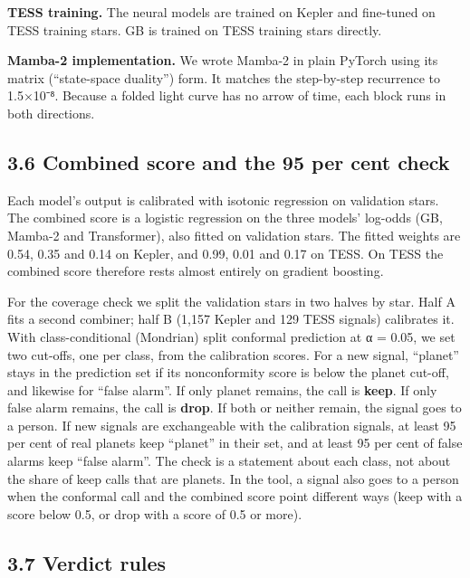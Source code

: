 \documentclass[
]{article}
\begin{document}
\textbf{TESS training.} The neural models are trained on Kepler and
fine-tuned on TESS training stars. GB is trained on TESS training stars
directly.

\textbf{Mamba-2 implementation.} We wrote Mamba-2 in plain PyTorch using
its matrix (``state-space duality'') form. It matches the step-by-step
recurrence to 1.5×10⁻⁸. Because a folded light curve has no arrow of
time, each block runs in both directions.

\hypertarget{combined-score-and-the-95-per-cent-check}{%
\subsection{3.6 Combined score and the 95 per cent
check}\label{combined-score-and-the-95-per-cent-check}}

Each model's output is calibrated with isotonic regression on validation
stars. The combined score is a logistic regression on the three models'
log-odds (GB, Mamba-2 and Transformer), also fitted on validation stars.
The fitted weights are 0.54, 0.35 and 0.14 on Kepler, and 0.99, 0.01 and
0.17 on TESS. On TESS the combined score therefore rests almost entirely
on gradient boosting.

For the coverage check we split the validation stars in two halves by
star. Half A fits a second combiner; half B (1,157 Kepler and 129 TESS
signals) calibrates it. With class-conditional (Mondrian) split
conformal prediction at α = 0.05, we set two cut-offs, one per class,
from the calibration scores. For a new signal, ``planet'' stays in the
prediction set if its nonconformity score is below the planet cut-off,
and likewise for ``false alarm''. If only planet remains, the call is
\textbf{keep}. If only false alarm remains, the call is \textbf{drop}.
If both or neither remain, the signal goes to a person. If new signals
are exchangeable with the calibration signals, at least 95 per cent of
real planets keep ``planet'' in their set, and at least 95 per cent of
false alarms keep ``false alarm''. The check is a statement about each
class, not about the share of keep calls that are planets. In the tool,
a signal also goes to a person when the conformal call and the combined
score point different ways (keep with a score below 0.5, or drop with a
score of 0.5 or more).

\hypertarget{verdict-rules}{%
\subsection{3.7 Verdict rules}\label{verdict-rules}}
\end{document}
